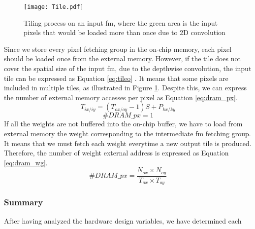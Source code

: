 %
\begin{figure}
    \centering
    \texttt{[image: Tile.pdf]}
    \caption{Tiling process on an input \acrshort{fm}, where the green area is the input pixels that would be loaded more than once due to 2D convolution}
    \label{fig:tilei}
\end{figure}
%
Since we store every pixel fetching group in the on-chip memory, each pixel should be loaded once from the external memory. However, if the tile does not cover the spatial size of the input \acrshort{fm}, due to the depthwise convolution, the input tile can be expressed as Equation \eqref{eq:tileo} \cite{ma_optimizing_2018}. It means that some pixels are included in multiple tiles, as illustrated in Figure \ref{fig:tilei}. Despite this, we can express the number of external memory accesses per pixel as Equation \eqref{eq:dram_px}.
%
\begin{equation}
    T_{ix/iy} = \left( T_{ox/oy} - 1\right) S + P_{kx/ky}
    \label{eq:tileo}
\end{equation}
\begin{equation}
    \#DRAM\_px = 1
    \label{eq:dram_px}
\end{equation}
%
If all the weights are not buffered into the on-chip buffer, we have to load from external memory the weight corresponding to the intermediate \acrshort{fm} fetching group. It means that we must fetch each weight everytime a new output tile is produced. Therefore, the number of weight external address is expressed as Equation \eqref{eq:dram_wg}.
%
\begin{equation}
    \#DRAM\_px = \frac{N_{ox} \times N_{oy}}{T_{ox} \times T_{oy}}
    \label{eq:dram_wg}
\end{equation}
%
\subsubsection{Summary}
%
After having analyzed the hardware design variables, we have determined each
